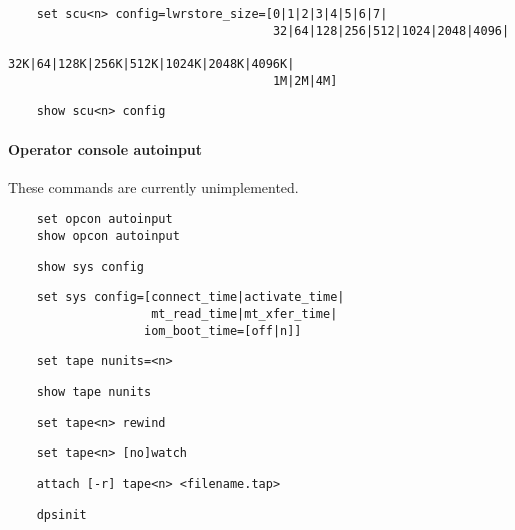 \documentclass[notitlepage]{report}
\begin{document}
\begin{lstlisting}
	set scu<n> config=lwrstore_size=[0|1|2|3|4|5|6|7|
	                                 32|64|128|256|512|1024|2048|4096|
	                                 32K|64|128K|256K|512K|1024K|2048K|4096K|
	                                 1M|2M|4M]
\end{lstlisting}

\begin{lstlisting}
	show scu<n> config
\end{lstlisting}

\paragraph{Operator console autoinput}

These commands are currently unimplemented.

\begin{lstlisting}
	set opcon autoinput
	show opcon autoinput
\end{lstlisting}

\begin{lstlisting}
	show sys config
\end{lstlisting}

\begin{lstlisting}
	set sys config=[connect_time|activate_time|
	                mt_read_time|mt_xfer_time|
	               iom_boot_time=[off|n]]
\end{lstlisting}

\begin{lstlisting}
	set tape nunits=<n>
\end{lstlisting}

\begin{lstlisting}
	show tape nunits
\end{lstlisting}

\begin{lstlisting}
	set tape<n> rewind
\end{lstlisting}

\begin{lstlisting}
	set tape<n> [no]watch
\end{lstlisting}

\begin{lstlisting}
	attach [-r] tape<n> <filename.tap>
\end{lstlisting}

\begin{lstlisting}
	dpsinit
\end{lstlisting}
\end{document}
